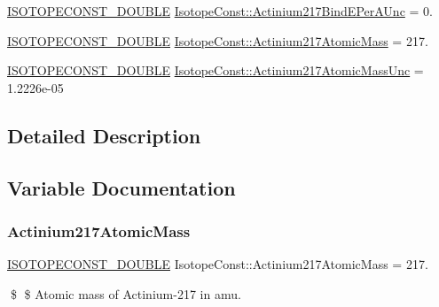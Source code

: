 \begin{DoxyCompactItemize}
\mbox{\hyperlink{group___isotope_const-_macros_ga8f45a7272ce02c0b4c65c44636ed719a}{I\+S\+O\+T\+O\+P\+E\+C\+O\+N\+S\+T\+\_\+\+D\+O\+U\+B\+LE}} \mbox{\hyperlink{group___isotope_const-_actinium-_ac217_ga6e1b539deb4e64fc9f396de9a118b757}{Isotope\+Const\+::\+Actinium217\+Bind\+E\+Per\+A\+Unc}} = 0.
\item 
\mbox{\hyperlink{group___isotope_const-_macros_ga8f45a7272ce02c0b4c65c44636ed719a}{I\+S\+O\+T\+O\+P\+E\+C\+O\+N\+S\+T\+\_\+\+D\+O\+U\+B\+LE}} \mbox{\hyperlink{group___isotope_const-_actinium-_ac217_ga68d25a9349a5480875230708d0cec19e}{Isotope\+Const\+::\+Actinium217\+Atomic\+Mass}} = 217.
\item 
\mbox{\hyperlink{group___isotope_const-_macros_ga8f45a7272ce02c0b4c65c44636ed719a}{I\+S\+O\+T\+O\+P\+E\+C\+O\+N\+S\+T\+\_\+\+D\+O\+U\+B\+LE}} \mbox{\hyperlink{group___isotope_const-_actinium-_ac217_ga69187c96085a2b415de16d3e6289dea1}{Isotope\+Const\+::\+Actinium217\+Atomic\+Mass\+Unc}} = 1.\+2226e-\/05
\end{DoxyCompactItemize}


\subsection{Detailed Description}


\subsection{Variable Documentation}
\mbox{\label{group___isotope_const-_actinium-_ac217_ga68d25a9349a5480875230708d0cec19e}} 
\subsubsection{\texorpdfstring{Actinium217\+Atomic\+Mass}{Actinium217AtomicMass}}
{\footnotesize\ttfamily \mbox{\hyperlink{group___isotope_const-_macros_ga8f45a7272ce02c0b4c65c44636ed719a}{I\+S\+O\+T\+O\+P\+E\+C\+O\+N\+S\+T\+\_\+\+D\+O\+U\+B\+LE}} Isotope\+Const\+::\+Actinium217\+Atomic\+Mass = 217.}

\$ \$ Atomic mass of Actinium-\/217 in amu. \mbox{\label{group___isotope_const-_actinium-_ac217_ga69187c96085a2b415de16d3e6289dea1}} 
